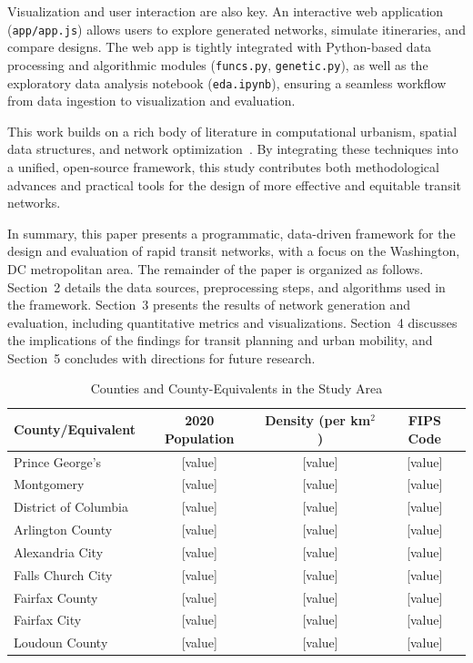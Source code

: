 \documentclass[manuscript]{acmart}
\begin{document}
Visualization and user interaction are also key. An interactive web application (\texttt{app/app.js}) allows users to explore generated networks, simulate itineraries, and compare designs. The web app is tightly integrated with Python-based data processing and algorithmic modules (\texttt{funcs.py}, \texttt{genetic.py}), as well as the exploratory data analysis notebook (\texttt{eda.ipynb}), ensuring a seamless workflow from data ingestion to visualization and evaluation.

This work builds on a rich body of literature in computational urbanism, spatial data structures, and network optimization~\cite{bib:bast2016route, bib:chien2001genetic, bib:dib2017ga, bib:silverman1986density, bib:samet1984quadtrees}. By integrating these techniques into a unified, open-source framework, this study contributes both methodological advances and practical tools for the design of more effective and equitable transit networks.

In summary, this paper presents a programmatic, data-driven framework for the design and evaluation of rapid transit networks, with a focus on the Washington, DC metropolitan area. The remainder of the paper is organized as follows. Section~2 details the data sources, preprocessing steps, and algorithms used in the framework. Section~3 presents the results of network generation and evaluation, including quantitative metrics and visualizations. Section~4 discusses the implications of the findings for transit planning and urban mobility, and Section~5 concludes with directions for future research.



\begin{table}[h]
\caption{Counties and County-Equivalents in the Study Area}
\label{tab:counties}
\begin{tabular}{lccc}
\toprule
County/Equivalent & 2020 Population & Density (per km$^2$) & FIPS Code \\
\midrule
Prince George's & [value] & [value] & [value] \\
Montgomery & [value] & [value] & [value] \\
District of Columbia & [value] & [value] & [value] \\
Arlington County & [value] & [value] & [value] \\
Alexandria City & [value] & [value] & [value] \\
Falls Church City & [value] & [value] & [value] \\
Fairfax County & [value] & [value] & [value] \\
Fairfax City & [value] & [value] & [value] \\
Loudoun County & [value] & [value] & [value] \\
\bottomrule
\end{tabular}
\end{table}
\end{document}
